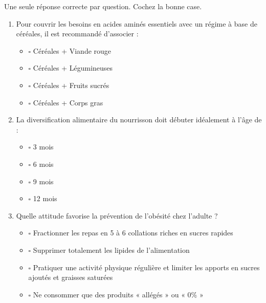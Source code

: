 \documentclass[11pt]{article}
\begin{document}
\begin{exercice}
Une seule réponse correcte par question. Cochez la bonne case.
\begin{enumerate}
\item Pour couvrir les besoins en acides aminés essentiels avec un régime à base de céréales, il est recommandé d'associer :
\begin{itemize}
    \item[] $\square$ Céréales + Viande rouge
    \item[] $\square$ Céréales + Légumineuses
    \item[] $\square$ Céréales + Fruits sucrés
    \item[] $\square$ Céréales + Corps gras
\end{itemize}
\item La diversification alimentaire du nourrisson doit débuter idéalement à l'âge de :
\begin{itemize}
    \item[] $\square$ 3 mois
    \item[] $\square$ 6 mois
    \item[] $\square$ 9 mois
    \item[] $\square$ 12 mois
\end{itemize}
\item Quelle attitude favorise la prévention de l'obésité chez l'adulte ?
\begin{itemize}
    \item[] $\square$ Fractionner les repas en 5 à 6 collations riches en sucres rapides
    \item[] $\square$ Supprimer totalement les lipides de l'alimentation
    \item[] $\square$ Pratiquer une activité physique régulière et limiter les apports en sucres ajoutés et graisses saturées
    \item[] $\square$ Ne consommer que des produits « allégés » ou « 0\% »
\end{itemize}
\end{enumerate}
\end{exercice}
\end{document}
